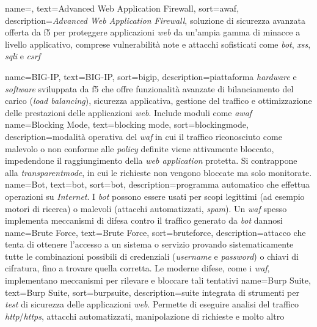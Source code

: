 

 {
    name=,
    text=Advanced Web Application Firewall,
    sort=awaf,
    description={\emph{Advanced Web Application Firewall}, soluzione di sicurezza avanzata offerta da \gls{f5} per proteggere applicazioni \emph{web} da un'ampia gamma di minacce a livello applicativo, comprese vulnerabilità note e attacchi sofisticati come \emph{\gls{bot}}, \emph{\gls{xss}}, \emph{\gls{sqli}} e \emph{\gls{csrf}}}
}

 {
    name=BIG-IP,
    text=BIG-IP,
    sort=bigip,
    description={piattaforma \emph{hardware} e \emph{software} sviluppata da \gls{f5} che offre funzionalità avanzate di bilanciamento del carico (\emph{load balancing}), sicurezza applicativa, gestione del traffico e ottimizzazione delle prestazioni delle applicazioni \emph{web}. Include moduli come \emph{\gls{awaf}}}
}
 {
    name=Blocking Mode,
    text=blocking mode,
    sort=blockingmode,
    description={modalità operativa del \emph{\gls{waf}} in cui il traffico riconosciuto come malevolo o non conforme alle \emph{\gls{policy}} definite viene attivamente bloccato, impedendone il raggiungimento della \emph{web application} protetta. Si contrappone alla \emph{\gls{transparentmode}}, in cui le richieste non vengono bloccate ma solo monitorate.}
}
 {
    name=Bot,
    text=bot,
    sort=bot,
    description={programma automatico che effettua operazioni su \emph{Internet}. I \emph{bot} possono essere usati per scopi legittimi (ad esempio motori di ricerca) o malevoli (attacchi automatizzati, \emph{spam}). Un \emph{\gls{waf}} spesso implementa meccanismi di difesa contro il traffico generato da \emph{bot} dannosi}
}
 {
    name=Brute Force,
    text=Brute Force,
    sort=bruteforce,
    description={attacco che tenta di ottenere l'accesso a un sistema o servizio provando sistematicamente tutte le combinazioni possibili di credenziali (\emph{username} e \emph{password}) o chiavi di cifratura, fino a trovare quella corretta. Le moderne difese, come i \emph{\gls{waf}}, implementano meccanismi per rilevare e bloccare tali tentativi}
}
 {
    name=Burp Suite,
    text=Burp Suite,
    sort=burpsuite,
    description={suite integrata di strumenti per \emph{test} di sicurezza delle applicazioni \emph{web}. Permette di eseguire analisi del traffico \emph{\gls{http}}/\emph{\gls{https}}, attacchi automatizzati, manipolazione di richieste e molto altro} 
}

